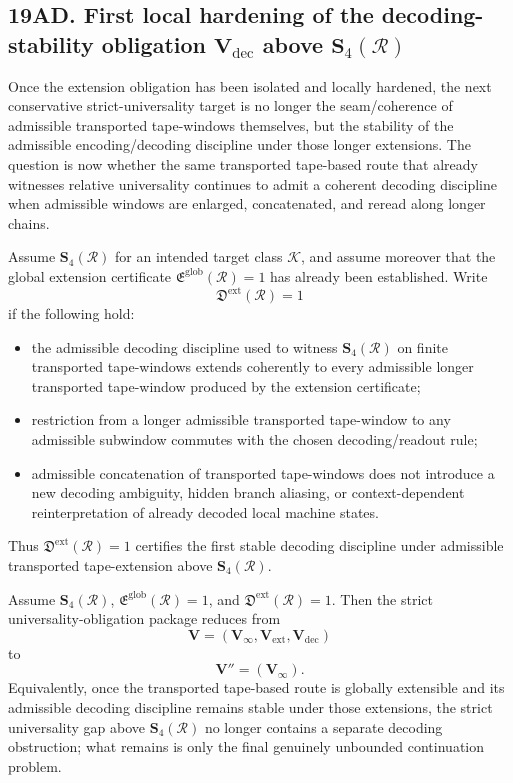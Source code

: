 \subsection*{19AD. First local hardening of the decoding-stability obligation \(\mathbf V_{\mathrm{dec}}\) above \(\mathbf S_4(\mathcal R)\)}
Once the extension obligation has been isolated and locally hardened, the next conservative strict-universality target is no longer the seam/coherence of admissible transported tape-windows themselves, but the stability of the admissible encoding/decoding discipline under those longer extensions. The question is now whether the same transported tape-based route that already witnesses relative universality continues to admit a coherent decoding discipline when admissible windows are enlarged, concatenated, and reread along longer chains.

\begin{definition}
Assume \(\mathbf S_4(\mathcal R)\) for an intended target class \(\mathcal K\), and assume moreover that the global extension certificate \(\mathfrak E^{\mathrm{glob}}(\mathcal R)=1\) has already been established.
Write
\[
\mathfrak D^{\mathrm{ext}}(\mathcal R)=1
\]
if the following hold:
\begin{itemize}[leftmargin=2em]
  \item the admissible decoding discipline used to witness \(\mathbf S_4(\mathcal R)\) on finite transported tape-windows extends coherently to every admissible longer transported tape-window produced by the extension certificate;
  \item restriction from a longer admissible transported tape-window to any admissible subwindow commutes with the chosen decoding/readout rule;
  \item admissible concatenation of transported tape-windows does not introduce a new decoding ambiguity, hidden branch aliasing, or context-dependent reinterpretation of already decoded local machine states.
\end{itemize}
Thus \(\mathfrak D^{\mathrm{ext}}(\mathcal R)=1\) certifies the first stable decoding discipline under admissible transported tape-extension above \(\mathbf S_4(\mathcal R)\).
\end{definition}

\begin{proposition}
Assume \(\mathbf S_4(\mathcal R)\), \(\mathfrak E^{\mathrm{glob}}(\mathcal R)=1\), and \(\mathfrak D^{\mathrm{ext}}(\mathcal R)=1\). Then the strict universality-obligation package reduces from
\[
\mathbf V=(\mathbf V_\infty,\mathbf V_{\mathrm{ext}},\mathbf V_{\mathrm{dec}})
\]
to
\[
\mathbf V''=(\mathbf V_\infty).
\]
Equivalently, once the transported tape-based route is globally extensible and its admissible decoding discipline remains stable under those extensions, the strict universality gap above \(\mathbf S_4(\mathcal R)\) no longer contains a separate decoding obstruction; what remains is only the final genuinely unbounded continuation problem.
\end{proposition}

